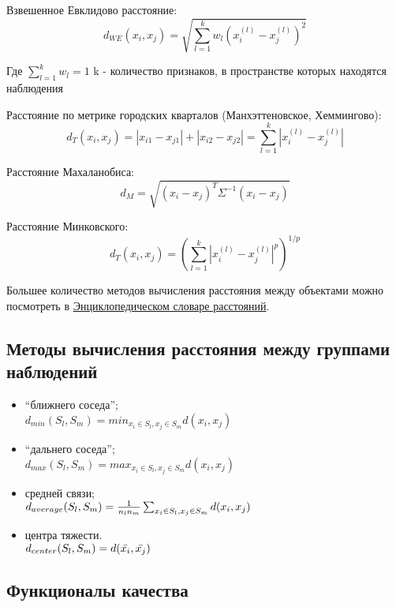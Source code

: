 \documentclass[a4paper,12pt]{article} %
\begin{document}
Взвешенное Евклидово расстояние:
\[d_{WE}(x_i, x_j) = \sqrt{\sum\limits_{l=1}^k w_l(x_i^{(l)}-x_j^{(l)})^2}\]

Где $\sum\limits_{l=1}^k w_l=1$ k - количество признаков, в пространстве которых находятся наблюдения 

Расстояние по метрике городских кварталов (Манхэттеновское, Хеммингово):
\[d_T(x_i, x_j) = |x_{i1} - x_{j1}| + |x_{i2}-x_{j2}| = \sum\limits_{l=1}^k |x_i^{(l)}-x_j^{(l)}|\]

Расстояние Махаланобиса:
\[d_M=\sqrt{(x_i-x_j)^T \Sigma^{-1}(x_i-x_j)}\]

Расстояние Минковского:
\[d_T(x_i, x_j) = \left(\sum\limits_{l=1}^k |x_i^{(l)}-x_j^{(l)}|^p\right)^{1/p}\]

Большее количество методов вычисления расстояния между объектами можно посмотреть в \href{https://github.com/Shred27/MSM/blob/main/Dictionary_Of_Distances_Deza.pdf}{Энциклопедическом словаре расстояний}.

\subsection{Методы вычисления расстояния между группами наблюдений} 
    \begin{itemize}
        \item “ближнего соседа”;\\
        $d_{min}(S_l,S_m)=min_{x_i \in S_l,x_j \in S_m}d(x_i,x_j)$
        
         \item “дальнего соседа”;\\
        $d_{max}(S_l,S_m)=max_{x_i \in S_l,x_j \in S_m}d(x_i,x_j)$
        
        \item средней связи;\\
         $d_{average}(S_l,S_m)={{1} \over{n_ln_m}}\sum_{x_i \in S_l,x_j \in S_m}d(x_i,x_j)$
         
          \item центра тяжести.\\
        $d_{center}(S_l,S_m)=d(\Bar{x_i},\Bar{x_j}) $
    \end{itemize}

\subsection{Функционалы качества}
\end{document}
